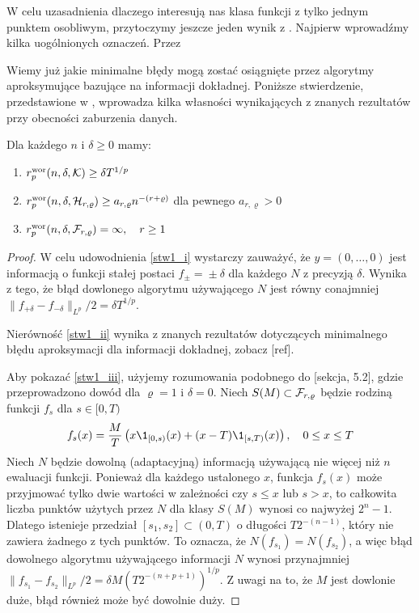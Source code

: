 \documentclass[oik, pdftex, robocza, man]{mgrwms}
\begin{document}
    W celu uzasadnienia dlaczego interesują nas klasa funkcji z tylko jednym punktem osobliwym, przytoczymy jeszcze jeden wynik z \cite{PoA}. Najpierw wprowadźmy kilka uogólnionych oznaczeń. Przez 

    Wiemy już jakie minimalne błędy mogą zostać osiągnięte przez algorytmy aproksymujące bazujące na informacji dokładnej. Poniższe stwierdzenie, przedstawione w \cite{AoP}, wprowadza kilka własności wynikających z znanych rezultatów przy obecności zaburzenia danych.

    \begin{stw} \label{stw1}
        Dla każdego $n$ i $\delta \geq 0$ mamy:
        \begin{enumerate}[label=(\roman*)]
            \item \label{stw1_i} $r^{\mathrm{wor}}_{p}(n, \delta, \mathcal{K}) \geq \delta T^{1/p}$
            \item \label{stw1_ii} $r^{\mathrm{wor}}_{p}(n, \delta, \mathcal{H}_{r,\varrho}) \geq a_{r,\varrho}n^{-(r + \varrho)}$ dla pewnego $a_{r,\varrho} > 0$
            \item \label{stw1_iii} $r^{\mathrm{wor}}_{p}(n, \delta, \mathcal{F}_{r,\varrho}) = \infty, \quad r \geq 1$
        \end{enumerate}
    \end{stw}
    \begin{proof}
        W celu udowodnienia \ref{stw1_i} wystarczy zauważyć, że $y = (0, \ldots, 0)$ jest informacją o funkcji stałej postaci $f_{\pm} \!=\! \pm \delta$ dla każdego $N$ z precyzją $\delta$. Wynika z tego, że błąd dowlonego algorytmu używającego $N$ jest równy conajmniej $\| f_{+\delta} - f_{-\delta} \|_{L^{p}} / 2 = \delta T^{1/p}$.

        Nierówność \ref{stw1_ii} wynika z znanych rezultatów dotyczących minimalnego błędu aproksymacji dla informacji dokładnej, zobacz [ref].

        Aby pokazać \ref{stw1_iii}, użyjemy rozumowania podobnego do \cite{PoA} [sekcja, 5.2], gdzie przeprowadzono dowód dla $\varrho = 1$ i $\delta = 0$. Niech $S(M) \subset \mathcal{F}_{r, \varrho}$ będzie rodziną funkcji $f_{s}$ dla $s \in [0, T)$
        \begin{equation*}
            f_{s}(x) = \frac{M}{T}\left( x\1_{[0,s)}(x) + (x-T)\1_{[s,T)}(x) \right), \quad 0 \leq x \leq T
        \end{equation*}
        Niech $N$ będzie dowolną (adaptacyjną) informacją używającą nie więcej niż $n$ ewaluacji funkcji. Ponieważ dla każdego ustalonego $x$, funkcja $f_{s}(x)$ może przyjmować tylko dwie wartości w zależności czy $s \leq x$ lub $s > x$, to całkowita liczba punktów użytych przez $N$ dla klasy $S(M)$ wynosi co najwyżej $2^{n}-1$. Dlatego istenieje przedział $[s_{1}, s_{2}] \subset (0,T)$ o długości $T 2^{-(n-1)}$, który nie zawiera żadnego z tych punktów. To oznacza, że  $N(f_{s_{1}}) = N(f_{s_{2}})$, a więc błąd dowolnego algorytmu używającego informacji $N$ wynosi przynajmniej $\| f_{s_{1}} - f_{s_{2}} \|_{L^{p}} / 2 = \delta M(T 2^{-(n+p+1)})^{1/p}$. Z uwagi na to, że $M$ jest dowlonie duże, błąd również może być dowolnie duży.
    \end{proof}
\end{document}

